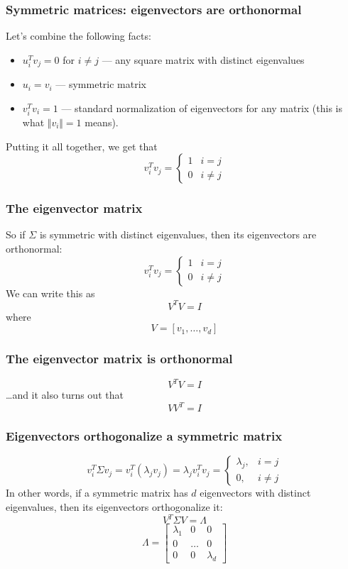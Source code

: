 \documentclass{beamer}
\begin{document}
\begin{frame}
  \frametitle{Symmetric matrices: eigenvectors are orthonormal}
  Let's combine the following facts:
  \begin{itemize}
  \item ${u}_i^T{v}_j=0$ for $i\ne j$ --- any square matrix with distinct
    eigenvalues
  \item ${u}_i={v}_i$ --- symmetric matrix
  \item ${v}_i^T{v}_i=1$ --- standard normalization of
    eigenvectors for any matrix (this is what $\Vert{v}_i\Vert=1$ means).
  \end{itemize}
  Putting it all together, we get that
  \[
  {v}_i^T{v}_j=
  \begin{cases}
    1&i=j\\
    0&i\ne j
  \end{cases}
  \]
\end{frame}

\begin{frame}
  \frametitle{The eigenvector matrix}
  So if $\Sigma$ is symmetric with distinct eigenvalues, then
  its eigenvectors  are orthonormal:
  \[
  {v}_i^T{v}_j=
  \begin{cases}
    1&i=j\\
    0&i\ne j
  \end{cases}
  \]
  We can  write this as
  \[
  V^TV = I
  \]
  where
  \[
  V=\left[{v}_1,\ldots,{v}_{d}\right]
  \]
\end{frame}

\begin{frame}
  \frametitle{The eigenvector matrix is orthonormal}
  \[
  V^TV = I
  \]
  \ldots and it also turns out that
  \[
  VV^T = I
  \]
\end{frame}

\begin{frame}
  \frametitle{Eigenvectors orthogonalize a symmetric matrix}
  \[
  {v}_i^T\Sigma{v}_j=
  {v}_i^T(\lambda_j{v}_j)=\lambda_j{v}_i^T{v}_j
  =\begin{cases}\lambda_j,&i=j\\0,&i\ne j\end{cases}
  \]
  In other words, if a symmetric matrix has $d$ eigenvectors with
  distinct eigenvalues, then its eigenvectors orthogonalize it:
  \[
  V^T\Sigma V = \Lambda
  \]
  \[
  \Lambda=
  \left[\begin{array}{ccc}\lambda_1&0&0\\0&\ldots&0\\0&0&\lambda_{d}\end{array}\right]
  \]
\end{frame}
\end{document}
